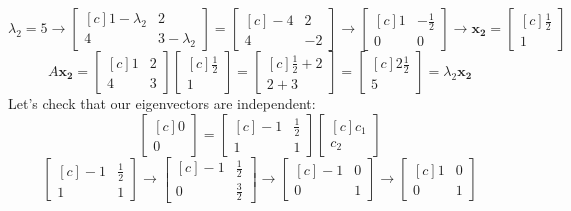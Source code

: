 \documentclass{tufte-handout}
\begin{document}
\[
\lambda_2=5
\rightarrow
\begin{bmatrix*}[c] 1-\lambda_2&2\\4&3-\lambda_2 \end{bmatrix*}
=
\begin{bmatrix*}[c] -4&2\\4&-2 \end{bmatrix*}
\rightarrow
\begin{bmatrix*}[c] 1&-\frac{1}{2}\\0&0 \end{bmatrix*}
\rightarrow
\mathbf{x_2}=
\begin{bmatrix*}[c] \frac{1}{2}\\1 \end{bmatrix*}
\]
\[
A\mathbf{x_2}=
\begin{bmatrix*}[c] 1&2\\4&3 \end{bmatrix*}
\begin{bmatrix*}[c] \frac{1}{2}\\1 \end{bmatrix*}
=
\begin{bmatrix*}[c] \frac{1}{2}+2\\2+3 \end{bmatrix*}
=
\begin{bmatrix*}[c] 2\frac{1}{2}\\5 \end{bmatrix*}
=\lambda_2\mathbf{x_2}
\]
Let's check that our eigenvectors are independent:
\[
\begin{bmatrix*}[c] 0\\0 \end{bmatrix*}
=
\begin{bmatrix*}[c] -1&\frac{1}{2}\\1&1 \end{bmatrix*}
\begin{bmatrix*}[c] c_1\\c_2 \end{bmatrix*}
\]
\[
\begin{bmatrix*}[c] -1&\frac{1}{2}\\1&1 \end{bmatrix*}
\rightarrow
\begin{bmatrix*}[c] -1&\frac{1}{2}\\0&\frac{3}{2} \end{bmatrix*}
\rightarrow
\begin{bmatrix*}[c] -1&0\\0&1 \end{bmatrix*}
\rightarrow
\begin{bmatrix*}[c] 1&0\\0&1 \end{bmatrix*}
\]
\end{document}
